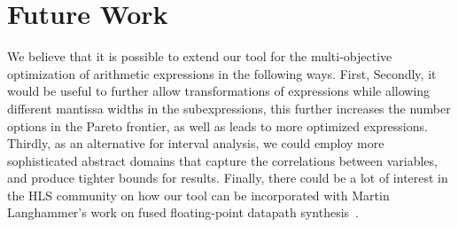 \chapter{Future Work}

We believe that it is possible to extend our tool for the multi-objective
optimization of arithmetic expressions in the following ways. First, Secondly,
it would be useful to further allow transformations of expressions while
allowing different mantissa widths in the subexpressions, this further
increases the number options in the Pareto frontier, as well as leads to more
optimized expressions. Thirdly, as an alternative for interval analysis, we
could employ more sophisticated abstract domains that capture the correlations
between variables, and produce tighter bounds for results. Finally, there
could be a lot of interest in the HLS community on how our tool can be
incorporated with Martin Langhammer's work on fused floating-point datapath
synthesis~\cite{langhammer}.


\cleardoublepage


{%
\renewcommand{\bibfont}{\normalfont\small}
\setlength{\biblabelsep}{0pt}
\setlength{\bibitemsep}{0.5\baselineskip plus 0.5\baselineskip}
\printbibliography[nottype=online]
\printbibliography[heading=subbibliography,title={Webseiten},type=online,prefixnumbers={@}]
}
\cleardoublepage

\listoffigures
\cleardoublepage

\listoftables
\cleardoublepage

% 

% 


